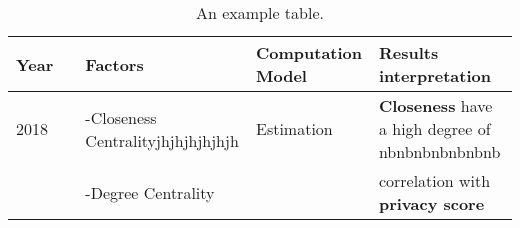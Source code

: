 	
\begin{table}[h!]
\scriptsize
\centering
	\begin{tabular}{lllll}
	Year &                            & \textbf{Factors}                  & \textbf{Computation Model} & \textbf{Results interpretation}                               \\\hline
	2018 & \cite{thubert_6tisch_2015} & -Closeness Centralityjhjhjhjhjhjh & Estimation                 & \textbf{Closeness} have a high degree of nbnbnbnbnbnbnb       \\
	\    &                            & -Degree Centrality                &                            & correlation with \textbf{privacy score}                       \\\hline
	\end{tabular}
	\caption{\label{tab:Table} An example table.}
\end{table}


